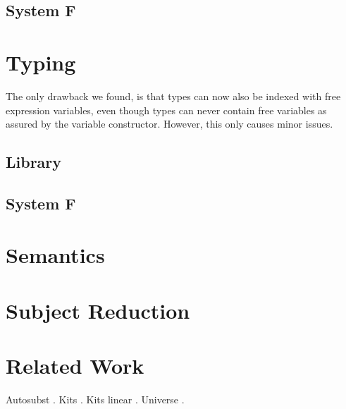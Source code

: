 \documentclass[sigplan,10pt]{acmart}
\newenvironment{LibCode*}{%
  \begin{tcolorbox}[%
    colframe=white,%
    boxrule=0.0pt,%
    top=2.5pt,%
    left=2.5pt,%
    bottom=2.5pt,%
    right=2.5pt,%
    boxsep=0pt%
  ]\vspace{-0.2\baselineskip}%
}{%
  \vspace{-1\baselineskip}%
  \end{tcolorbox}%
}
\newcommand*\LibCode[1]{\begin{LibCode*}{#1}\end{LibCode*}}
\newcommand*\AppCode[1]{{#1}}
\begin{document}
  \subsection{System F}
  \AppCode\FTypes

  \section{Typing}
  The only drawback we found, is that types can now also be indexed
  with free expression variables, even though types can never contain
  free variables as assured by the variable constructor. However, this
  only causes minor issues.

  \subsection{Library}
  \LibCode\KVariableTyping
  \LibCode\KTyping
  \LibCode\KTypingKit
  \LibCode\KMapTyping
  \LibCode\KLiftTyping
  \LibCode\KSingleTyping
  \LibCode\KTypingNotation
  \LibCode\KTypingTraversal
  \LibCode\KTypingInstances
  \subsection{System F}
  \AppCode\FTyping
  \AppCode\FTypingInst
  \AppCode\FPreserve
  \AppCode\FTypingTraversal

  \section{Semantics}
  \AppCode\FReduction

  \section{Subject Reduction}
  \AppCode\FSubjectReduction
  \AppCode\FSubjectReductionProofInteresting

  \section{Related Work}
  Autosubst \cite{DBLP:conf/cpp/StarkSK19, DBLP:conf/itp/SchaferTS15}.
  Kits \cite{DBLP:journals/jar/BentonHKM12, unpublished:mcbride2005kits}.
  Kits linear \cite{DBLP:journals/corr/abs-2005-02247}.
  Universe \cite{DBLP:journals/pacmpl/AllaisA0MM18}.

  

  \clearpage
  \appendix
\end{document}
